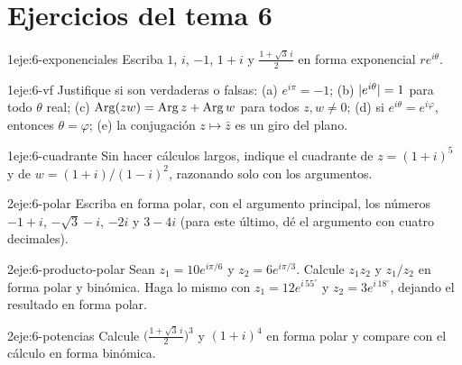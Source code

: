 \section*{Ejercicios del tema 6}

\begin{ejercicio}{1}{eje:6-exponenciales}
Escriba $1$, $i$, $-1$, $1+i$ y $\frac{1+\sqrt3\,i}{2}$ en forma exponencial $re^{i\theta}$.
\end{ejercicio}

\begin{ejercicio}{1}{eje:6-vf}
Justifique si son verdaderas o falsas: (a) $e^{i\pi}=-1$; (b) $\lvert e^{i\theta}\rvert=1$ para todo $\theta$ real; (c) $\operatorname{Arg}(zw)=\operatorname{Arg} z+\operatorname{Arg} w$ para todos $z,w\ne0$; (d) si $e^{i\theta}=e^{i\varphi}$, entonces $\theta=\varphi$; (e) la conjugación $z\mapsto\bar z$ es un giro del plano.
\end{ejercicio}

\begin{ejercicio}{1}{eje:6-cuadrante}
Sin hacer cálculos largos, indique el cuadrante de $z=(1+i)^{5}$ y de $w=(1+i)/(1-i)^{2}$, razonando solo con los argumentos.
\end{ejercicio}

\begin{ejercicio}{2}{eje:6-polar}
Escriba en forma polar, con el argumento principal, los números $-1+i$, $-\sqrt3-i$, $-2i$ y $3-4i$ (para este último, dé el argumento con cuatro decimales).
\end{ejercicio}

\begin{ejercicio}{2}{eje:6-producto-polar}
Sean $z_1=10e^{i\pi/6}$ y $z_2=6e^{i\pi/3}$. Calcule $z_1z_2$ y $z_1/z_2$ en forma polar y binómica. Haga lo mismo con $z_1=12e^{i\,55^{\circ}}$ y $z_2=3e^{i\,18^{\circ}}$, dejando el resultado en forma polar.
\end{ejercicio}

\begin{ejercicio}{2}{eje:6-potencias}
Calcule $\bigl(\frac{1+\sqrt3\,i}{2}\bigr)^{3}$ y $(1+i)^{4}$ en forma polar y compare con el cálculo en forma binómica.
\end{ejercicio}

